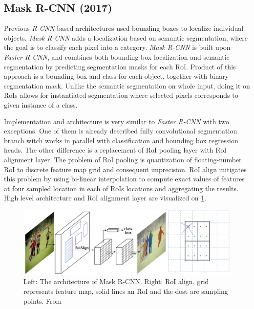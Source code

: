 \subsection{Mask R-CNN (2017)}
Previous \textit{R-CNN} based architectures used bounding boxes to localize individual objects. \textit{Mask R-CNN} \cite{bib:maskrcnn} adds a localization based on semantic segmentation, where the goal is to classify each pixel into a category. \textit{Mask R-CNN} is built upon \textit{Faster R-CNN}, and combines both bounding box localization and semantic segmentation by predicting segmentation masks for each RoI. Product of this approach is a bounding box and class for each object, together with binary segmentation mask. Unlike the semantic segmentation on whole input, doing it on RoIs allows for instantiated segmentation where selected pixels corresponds to given instance of a class.

Implementation and architecture is very similar to \textit{Faster R-CNN} with two exceptions. One of them is already described fully convolutional segmentation branch witch works in parallel with classification and bounding box regression heads. The other difference is a replacement of RoI pooling layer with RoI alignment layer. The problem of RoI pooling is quantization of floating-number RoI to discrete feature map grid and consequent imprecision. RoI align mitigates this problem by using bi-linear interpolation to compute exact values of features at four sampled location in each of RoIs locations and aggregating the results. High level architecture and RoI alignment layer are visualized on \cref{fig:maskrcnn}.



 \begin{figure}
     \centering
     \includegraphics[width=\textwidth]{img/maskrcnn}
     \caption{Left: The architecture of Mask R-CNN. Right: RoI align, grid represents feature map, solid lines an RoI and the dost are sampling points. From \cite[fig. 1, 3]{bib:maskrcnn}}
     \label{fig:maskrcnn}
 \end{figure}


